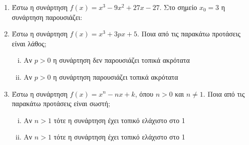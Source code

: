 \begin{enumerate}
    \item Έστω η συνάρτηση $ f(x) = x^{3} - 9x^{2}+27x-27 $. Στο σημείο $ x_{0} = 3 $ η συνάρτηση
        παρουσιάζει:


    \item Έστω η συνάρτηση $ f(x) = x^{3}+3px+5 $. Ποια από τις παρακάτω προτάσεις είναι λάθος;

        \begin{enumerate}[i)]
            \item Αν $ p>0 $ η συνάρτηση δεν παρουσιάζει τοπικά ακρότατα
            \item Αν $ p>0 $ η συνάρτηση παρουσιάζει τοπικά ακρότατα
        \end{enumerate}

    \item Έστω η συνάρτηση $ f(x) = x^{n}-nx+k $, όπου $ n>0 $ και $ n \neq 1 $. Ποια από τις
        παρακάτω προτάσεις είναι σωστή;

        \begin{enumerate}[i)]
            \item Αν $ n>1 $ τότε η συνάρτηση έχει τοπικό ελάχιστο στο 1
            \item Αν $ n>1 $ τότε η συνάρτηση έχει τοπικό ελάχιστο στο 1
        \end{enumerate}


\end{enumerate}




